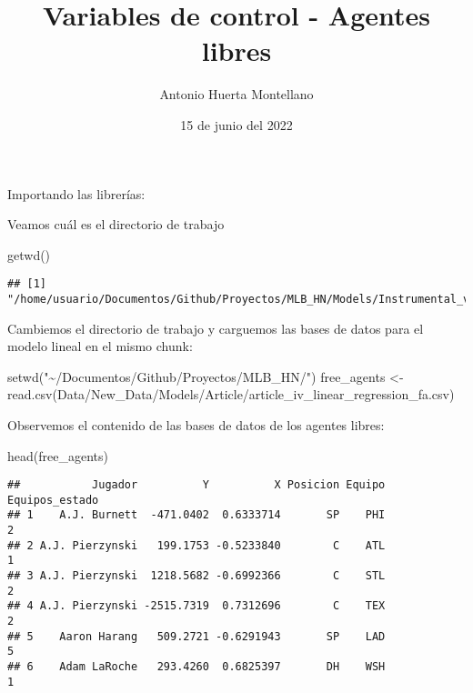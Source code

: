 \documentclass[
]{article}
\title{Variables de control - Agentes libres}
\author{Antonio Huerta Montellano}
\date{15 de junio del 2022}
\newenvironment{Shaded}{\begin{snugshade}}{\end{snugshade}}
\newcommand{\FunctionTok}[1]{\textcolor[rgb]{0.00,0.00,0.00}{#1}}
\newcommand{\NormalTok}[1]{#1}
\newcommand{\OtherTok}[1]{\textcolor[rgb]{0.56,0.35,0.01}{#1}}
\newcommand{\StringTok}[1]{\textcolor[rgb]{0.31,0.60,0.02}{#1}}
\begin{document}
\maketitle

Importando las librerías:

Veamos cuál es el directorio de trabajo

\begin{Shaded}
\begin{Highlighting}[]
\FunctionTok{getwd}\NormalTok{()}
\end{Highlighting}
\end{Shaded}

\begin{verbatim}
## [1] "/home/usuario/Documentos/Github/Proyectos/MLB_HN/Models/Instrumental_variables/Free_agent"
\end{verbatim}

Cambiemos el directorio de trabajo y carguemos las bases de datos para
el modelo lineal en el mismo chunk:

\begin{Shaded}
\begin{Highlighting}[]
\FunctionTok{setwd}\NormalTok{(}\StringTok{"\textasciitilde{}/Documentos/Github/Proyectos/MLB\_HN/"}\NormalTok{)}
\NormalTok{free\_agents }\OtherTok{\textless{}{-}} \FunctionTok{read.csv}\NormalTok{(}\StringTok{\textquotesingle{}Data/New\_Data/Models/Article/article\_iv\_linear\_regression\_fa.csv\textquotesingle{}}\NormalTok{)}
\end{Highlighting}
\end{Shaded}

Observemos el contenido de las bases de datos de los agentes libres:

\begin{Shaded}
\begin{Highlighting}[]
\FunctionTok{head}\NormalTok{(free\_agents)}
\end{Highlighting}
\end{Shaded}

\begin{verbatim}
##           Jugador          Y          X Posicion Equipo Equipos_estado
## 1    A.J. Burnett  -471.0402  0.6333714       SP    PHI              2
## 2 A.J. Pierzynski   199.1753 -0.5233840        C    ATL              1
## 3 A.J. Pierzynski  1218.5682 -0.6992366        C    STL              2
## 4 A.J. Pierzynski -2515.7319  0.7312696        C    TEX              2
## 5    Aaron Harang   509.2721 -0.6291943       SP    LAD              5
## 6    Adam LaRoche   293.4260  0.6825397       DH    WSH              1
\end{verbatim}
\end{document}
